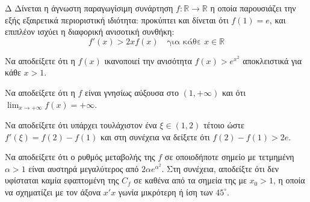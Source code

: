 \begin{thema}{Δ}
Δίνεται η άγνωστη παραγωγίσιμη συνάρτηση $f: \mathbb{R} \to \mathbb{R}$ η οποία παρουσιάζει την εξής εξαιρετικά περιοριστική ιδιότητα: προκύπτει και δίνεται ότι $f(1) = e$, και επιπλέον ισχύει η διαφορική ανισοτική συνθήκη:
\[ f'(x) > 2x f(x) \quad \text{για κάθε } x \in \mathbb{R} \]
\begin{erwthma}
    \item Να αποδείξετε ότι η $f(x)$ ικανοποιεί την ανισότητα $f(x) > e^{x^2}$ αποκλειστικά για κάθε $x > 1$. 
    \item Να αποδείξετε ότι η $f$ είναι γνησίως αύξουσα στο $(1, +\infty)$ και ότι $\displaystyle\lim_{x \to +\infty} f(x) = +\infty$. 
    \item Να αποδείξετε ότι υπάρχει τουλάχιστον ένα $\xi \in (1, 2)$ τέτοιο ώστε $f'(\xi) = f(2) - f(1)$ και στη συνέχεια να δείξετε ότι $f(2) - f(1) > 2e$. 
    \item Να αποδείξετε ότι ο ρυθμός μεταβολής της $f$ σε οποιοδήποτε σημείο με τετμημένη $\alpha > 1$ είναι αυστηρά μεγαλύτερος από $2\alpha e^{\alpha^2}$. Στη συνέχεια, αποδείξτε ότι δεν υφίσταται καμία εφαπτομένη της $C_f$ σε καθένα από τα σημεία της με $x_0 > 1$, η οποία να σχηματίζει με τον άξονα $x'x$ γωνία μικρότερη ή ίση των $45^\circ$. 
\end{erwthma}
\end{thema}
